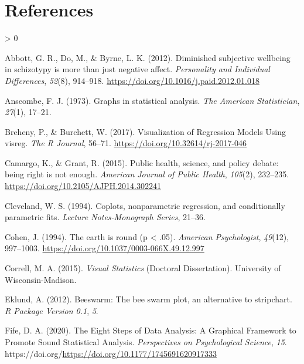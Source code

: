 \documentclass[
  english,
  man]{apa6}
\newlength{\cslhangindent}
\newenvironment{CSLReferences}[2] %
 {%
  \setlength{\parindent}{0pt}
  \ifodd #1 \everypar{\setlength{\hangindent}{\cslhangindent}}\ignorespaces\fi
  \ifnum #2 > 0
  \setlength{\parskip}{#2\baselineskip}
  \fi
 }%
 {}
\begin{document}
\newpage

\hypertarget{references}{%
\section{References}\label{references}}

\begingroup
\setlength{\parindent}{-0.5in}
\setlength{\leftskip}{0.5in}

\hypertarget{refs}{}
\begin{CSLReferences}{1}{0}
\leavevmode\hypertarget{ref-Abbott2012}{}%
Abbott, G. R., Do, M., \& Byrne, L. K. (2012). {Diminished subjective wellbeing in schizotypy is more than just negative affect}. \emph{Personality and Individual Differences}, \emph{52}(8), 914--918. \url{https://doi.org/10.1016/j.paid.2012.01.018}

\leavevmode\hypertarget{ref-anscombe1973graphs}{}%
Anscombe, F. J. (1973). Graphs in statistical analysis. \emph{The American Statistician}, \emph{27}(1), 17--21.

\leavevmode\hypertarget{ref-Breheny}{}%
Breheny, P., \& Burchett, W. (2017). {Visualization of Regression Models Using visreg}. \emph{The R Journal}, 56--71. \url{https://doi.org/10.32614/rj-2017-046}

\leavevmode\hypertarget{ref-Camargo2015}{}%
Camargo, K., \& Grant, R. (2015). {Public health, science, and policy debate: being right is not enough.} \emph{American Journal of Public Health}, \emph{105}(2), 232--235. \url{https://doi.org/10.2105/AJPH.2014.302241}

\leavevmode\hypertarget{ref-Cleveland1994}{}%
Cleveland, W. S. (1994). {Coplots, nonparametric regression, and conditionally parametric fits}. \emph{Lecture Notes-Monograph Series}, 21--36.

\leavevmode\hypertarget{ref-cohen_earth_1994}{}%
Cohen, J. (1994). {The earth is round (p {\textless{}} .05).} \emph{American Psychologist}, \emph{49}(12), 997--1003. \url{https://doi.org/10.1037/0003-066X.49.12.997}

\leavevmode\hypertarget{ref-Correll2015}{}%
Correll, M. A. (2015). \emph{{Visual Statistics}} (Doctoral Dissertation). University of Wisconsin-Madison.

\leavevmode\hypertarget{ref-eklund2012beeswarm}{}%
Eklund, A. (2012). Beeswarm: The bee swarm plot, an alternative to stripchart. \emph{R Package Version 0.1}, \emph{5}.

\leavevmode\hypertarget{ref-Fife2019e}{}%
Fife, D. A. (2020). {The Eight Steps of Data Analysis: A Graphical Framework to Promote Sound Statistical Analysis}. \emph{Perspectives on Psychological Science}, \emph{15}. https://doi.org/\url{https://doi.org/10.1177/1745691620917333}


\end{CSLReferences}
\end{document}
